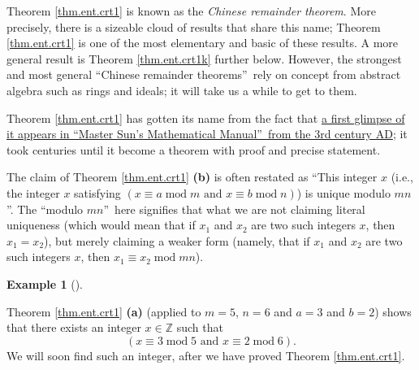 \documentclass[numbers=enddot,12pt,final,onecolumn,notitlepage]{scrartcl}%
\numberwithin{exer}{subsection}
\theoremstyle{definition}
\newtheorem{exam}[theo]{Example}
\newenvironment{example}[1][]
{\begin{exam}[#1]\begin{leftbar}}
{\end{leftbar}\end{exam}}
\begin{document}
Theorem \ref{thm.ent.crt1} is known as the \textit{Chinese remainder theorem}.
More precisely, there is a sizeable cloud of results that share this name;
Theorem \ref{thm.ent.crt1} is one of the most elementary and basic of these
results. A more general result is Theorem \ref{thm.ent.crt1k} further below.
However, the strongest and most general \textquotedblleft Chinese remainder
theorems\textquotedblright\ rely on concept from abstract algebra such as
rings and ideals; it will take us a while to get to them.

Theorem \ref{thm.ent.crt1} has gotten its name from the fact that
\href{https://en.wikipedia.org/wiki/Chinese_remainder_theorem#History}{a first
glimpse of it appears in \textquotedblleft Master Sun's Mathematical
Manual\textquotedblright\ from the 3rd century AD}; it took centuries until it
become a theorem with proof and precise statement.

The claim of Theorem \ref{thm.ent.crt1} \textbf{(b)} is often restated as
\textquotedblleft This integer $x$ (i.e., the integer $x$ satisfying $\left(
x\equiv a\operatorname{mod}m\text{ and }x\equiv b\operatorname{mod}n\right)
$) is unique modulo $mn$\textquotedblright. The \textquotedblleft modulo
$mn$\textquotedblright\ here signifies that what we are not claiming literal
uniqueness (which would mean that if $x_{1}$ and $x_{2}$ are two such integers
$x$, then $x_{1}=x_{2}$), but merely claiming a weaker form (namely, that if
$x_{1}$ and $x_{2}$ are two such integers $x$, then $x_{1}\equiv
x_{2}\operatorname{mod}mn$).

\begin{example}
Theorem \ref{thm.ent.crt1} \textbf{(a)} (applied to $m=5$, $n=6$ and $a=3$ and
$b=2$) shows that there exists an integer $x\in\mathbb{Z}$ such that%
\[
\left(  x\equiv3\operatorname{mod}5\text{ and }x\equiv2\operatorname{mod}%
6\right)  .
\]
We will soon find such an integer, after we have proved Theorem
\ref{thm.ent.crt1}.
\end{example}
\end{document}
